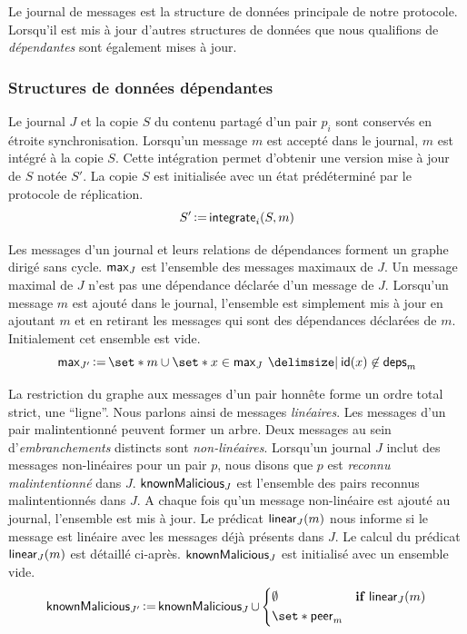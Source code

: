 Le journal de messages est la structure de données principale de notre protocole.
Lorsqu'il est mis à jour d'autres structures de données que nous qualifions de \emph{dépendantes} sont également mises à jour.

\subsubsection{Structures de données dépendantes}

Le journal $J$ et la copie $S$ du contenu partagé d'un pair $p_i$ sont conservés en étroite synchronisation.
Lorsqu'un message $m$ est accepté dans le journal, $m$ est intégré à la copie $S$.
Cette intégration permet d'obtenir une version mise à jour de $S$ notée $S'$.
La copie $S$ est initialisée avec un état prédéterminé par le protocole de réplication.
%
\begin{equation}
    S' \operatorname{\vcentcolon=} \operatorname{\mathsf{integrate}}_i(S, m)
\end{equation}

Les messages d'un journal et leurs relations de dépendances forment un graphe dirigé sans cycle.
$\operatorname{\mathsf{max}}_J$ est l'ensemble des messages maximaux de $J$.
Un message maximal de $J$ n'est pas une dépendance déclarée d'un message de $J$.
Lorsqu'un message $m$ est ajouté dans le journal, l'ensemble est simplement mis à jour en ajoutant $m$ et en retirant les messages qui sont des dépendances déclarées de $m$.
Initialement cet ensemble est vide.
%
\begin{equation}
    \trm{max}_{J'} \assign \set*{m} \cup \set*{x \in \trm{max}_J \given \trm{id}(x) \not\in \trm{deps}_m}
\end{equation}

La restriction du graphe aux messages d'un pair honnête forme un ordre total strict, une \enquote{ligne}.
Nous parlons ainsi de messages \emph{linéaires}.
Les messages d'un pair malintentionné peuvent former un arbre.
Deux messages au sein d'\emph{embranchements} distincts sont \emph{non-linéaires}.
Lorsqu'un journal $J$ inclut des messages non-linéaires pour un pair $p$, nous disons que $p$ est \emph{reconnu malintentionné} dans $J$.
$\operatorname{\mathsf{knownMalicious}}_J$ est l'ensemble des pairs reconnus malintentionnés dans $J$.
A chaque fois qu'un message non-linéaire est ajouté au journal, l'ensemble est mis à jour.
Le prédicat $\operatorname{\mathsf{linear}}_J(m)$ nous informe si le message est linéaire avec les messages déjà présents dans $J$.
Le calcul du prédicat $\operatorname{\mathsf{linear}}_J(m)$ est détaillé ci-après.
$\operatorname{\mathsf{knownMalicious}}_J$ est initialisé avec un ensemble vide.
%
\begin{equation}
    \trm{knownMalicious}_{J'} \assign \trm{knownMalicious}_J \cup \begin{dcases}
        \emptyset & \when \trm{linear}_J(m)\\
        \set*{\trm{peer}_m} &
    \end{dcases}
\end{equation}

